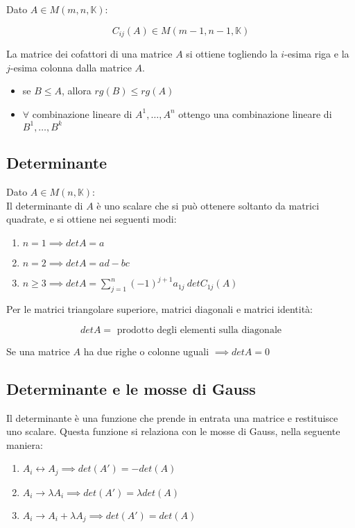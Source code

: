 \documentclass{article}
\begin{document}
Dato $A \in M(m,n,\mathbb{K})$:

$$
C_{ij} (A) \in M(m-1, n-1, \mathbb{K})
$$

\noindent
La matrice dei cofattori di una matrice $A$ si ottiene togliendo la $i$-esima riga e la $j$-esima colonna dalla matrice $A$.

\begin{itemize}
    \item se $B \leq A$, allora $rg(B) \leq rg(A)$
    \item $\forall$ combinazione lineare di $A^1,  \dots, A^n$ ottengo una combinazione lineare di $B^1, \dots, B^k$
\end{itemize}

\subsection{Determinante}

Dato $A \in M(n,\mathbb{K})$:\\

\noindent
Il determinante di $A$ è uno scalare che si può ottenere soltanto da matrici quadrate, e si ottiene nei seguenti modi:

\begin{enumerate}
	\item $n = 1 \implies det A = a$
	\item $n = 2 \implies det A = ad - bc$
	\item $n \geq 3 \implies det A = \sum^{n}_{j=1} (-1)^{j+1} a_{1j} \ det C_{1j} (A)$
\end{enumerate}

\noindent
Per le matrici triangolare superiore, matrici diagonali e matrici identità:

$$
det A = \text{ prodotto degli elementi sulla diagonale}
$$

\noindent
Se una matrice $A$ ha due righe o colonne uguali $\implies det A = 0$

\subsection{Determinante e le mosse di Gauss}

Il determinante è una funzione che prende in entrata una matrice e restituisce uno scalare.
Questa funzione si relaziona con le mosse di Gauss, nella seguente maniera:

\begin{enumerate}
	\item $A_i \leftrightarrow A_j \implies det(A') = -det(A)$
	\item $A_i \rightarrow \lambda A_i \implies det(A') = \lambda det(A)$
	\item $A_i \rightarrow A_i + \lambda A_j \implies det(A') = det(A)$
\end{enumerate}
\end{document}
